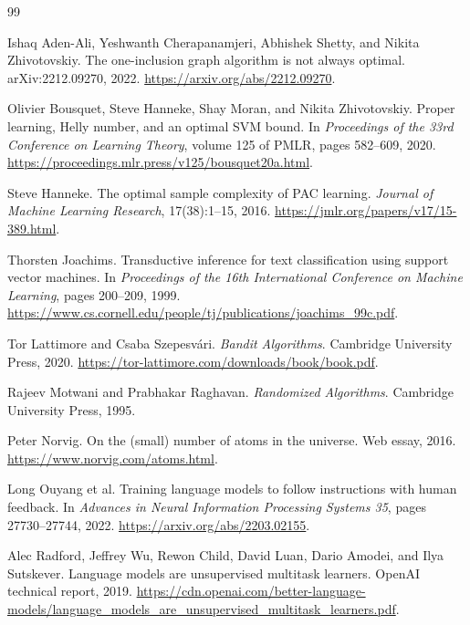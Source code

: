 \documentclass[11pt,twoside]{article}
\theoremstyle{definition}
\theoremstyle{remark}
\begin{document}
\begin{thebibliography}{99}

Ishaq Aden-Ali, Yeshwanth Cherapanamjeri, Abhishek Shetty, and Nikita
Zhivotovskiy.
\newblock The one-inclusion graph algorithm is not always optimal.
\newblock arXiv:2212.09270, 2022.
\newblock \url{https://arxiv.org/abs/2212.09270}.

Olivier Bousquet, Steve Hanneke, Shay Moran, and Nikita Zhivotovskiy.
\newblock Proper learning, Helly number, and an optimal SVM bound.
\newblock In \emph{Proceedings of the 33rd Conference on Learning Theory},
volume 125 of PMLR, pages 582--609, 2020.
\newblock \url{https://proceedings.mlr.press/v125/bousquet20a.html}.

Steve Hanneke.
\newblock The optimal sample complexity of PAC learning.
\newblock \emph{Journal of Machine Learning Research}, 17(38):1--15, 2016.
\newblock \url{https://jmlr.org/papers/v17/15-389.html}.

Thorsten Joachims.
\newblock Transductive inference for text classification using support vector
machines.
\newblock In \emph{Proceedings of the 16th International Conference on
Machine Learning}, pages 200--209, 1999.
\newblock \url{https://www.cs.cornell.edu/people/tj/publications/joachims_99c.pdf}.

Tor Lattimore and Csaba Szepesv\'ari.
\newblock \emph{Bandit Algorithms}.
\newblock Cambridge University Press, 2020.
\newblock \url{https://tor-lattimore.com/downloads/book/book.pdf}.

Rajeev Motwani and Prabhakar Raghavan.
\newblock \emph{Randomized Algorithms}.
\newblock Cambridge University Press, 1995.

Peter Norvig.
\newblock On the (small) number of atoms in the universe.
\newblock Web essay, 2016.
\newblock \url{https://www.norvig.com/atoms.html}.

Long Ouyang et al.
\newblock Training language models to follow instructions with human feedback.
\newblock In \emph{Advances in Neural Information Processing Systems 35},
pages 27730--27744, 2022.
\newblock \url{https://arxiv.org/abs/2203.02155}.

Alec Radford, Jeffrey Wu, Rewon Child, David Luan, Dario Amodei, and Ilya
Sutskever.
\newblock Language models are unsupervised multitask learners.
\newblock OpenAI technical report, 2019.
\newblock \url{https://cdn.openai.com/better-language-models/language_models_are_unsupervised_multitask_learners.pdf}.


\end{thebibliography}
\end{document}
